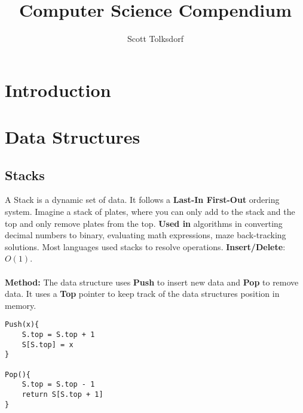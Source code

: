 \documentclass{article}
\begin{document}
\reversemarginpar
{}

\title{Computer Science Compendium}
\author{Scott Tolksdorf}
\maketitle
\clearpage
\setcounter{tocdepth}{2}
\tableofcontents
\clearpage
\section{Introduction}


\clearpage
\section{Data Structures}


\subsection{Stacks}
A Stack is a dynamic set of data. It follows a {\bf Last-In First-Out} ordering system. Imagine a stack of plates, where you can only add to the stack and the top and only remove plates from the top. {\bf Used in} algorithms in converting decimal numbers to binary, evaluating math expressions, maze back-tracking solutions. Most languages used stacks to resolve operations. {\bf Insert/Delete}: $O(1)$.
\\ \\
{\bf Method:} The data structure uses {\bf Push} to insert new data and {\bf Pop} to remove data. It uses a {\bf Top} pointer to keep track of the data structures position in memory.

\begin{lstlisting}[style=pseudo]
Push(x){
	S.top = S.top + 1
	S[S.top] = x
}

Pop(){
	S.top = S.top - 1
	return S[S.top + 1]
}
\end{lstlisting}
\end{document}
